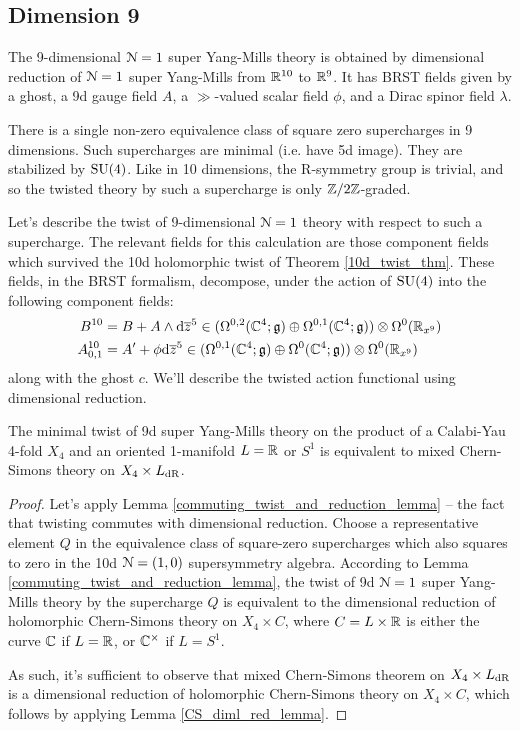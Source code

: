 \documentclass[10pt, oneside]{article}
\begin{document}
\subsection{Dimension 9}
The 9-dimensional $\mathcal{N}=1$ super Yang-Mills theory is obtained by dimensional reduction of $\mathcal{N}=1$ super Yang-Mills from $\mathbb R^{10}$ to $\mathbb R^9$.  It has BRST fields given by a ghost, a 9d gauge field $A$, a $\gg$-valued scalar field $\phi$, and a Dirac spinor field $\lambda$.

There is a single non-zero equivalence class of square zero supercharges in 9 dimensions. Such supercharges are minimal (i.e. have 5d image).  They are stabilized by $\mathrm{SU}(4)$.  Like in 10 dimensions, the R-symmetry group is trivial, and so the twisted theory by such a supercharge is only $\mathbb Z/2\mathbb Z$-graded.

Let's describe the twist of 9-dimensional $\mathcal{N}=1$ theory with respect to such a supercharge.  The relevant fields for this calculation are those component fields which survived the 10d holomorphic twist of Theorem \ref{10d_twist_thm}.  These fields, in the BRST formalism, decompose, under the action of $\mathrm{SU}(4)$ into the following component fields:
\begin{align*}
B^{10} &= B + A \wedge {\rm d} \overline{z}^5 \in (\Omega^{0,2}(\mathbb C^4; \mathfrak{g}) \oplus \Omega^{0,1}(\mathbb C^4; \mathfrak{g})) \otimes \Omega^0(\mathbb R_{x^9}) \\
A^{10}_{0,1} &= A' + \phi {\rm d} \overline{z}^5 \in (\Omega^{0,1}(\mathbb C^4; \mathfrak{g}) \oplus \Omega^0(\mathbb C^4; \mathfrak{g})) \otimes \Omega^0(\mathbb R_{x^9})
\end{align*}
along with the ghost $c$.  We'll describe the twisted action functional using dimensional reduction.


\begin{theorem} \label{9d_twist_thm}
The minimal twist of 9d super Yang-Mills theory on the product of a Calabi-Yau 4-fold $X_4$ and an oriented 1-manifold $L = \mathbb R$ or $S^1$ is equivalent to mixed Chern-Simons theory on $X_4 \times L_{\mathrm{dR}}$.
\end{theorem}

\begin{proof}
Let's apply Lemma \ref{commuting_twist_and_reduction_lemma} -- the fact that twisting commutes with dimensional reduction.  Choose a representative element $Q$ in the equivalence class of square-zero supercharges which also squares to zero in the 10d $\mathcal{N}=(1,0)$ supersymmetry algebra.  According to Lemma \ref{commuting_twist_and_reduction_lemma}, the twist of 9d $\mathcal{N}=1$ super Yang-Mills theory by the supercharge $Q$ is equivalent to the dimensional reduction of holomorphic Chern-Simons theory on $X_4 \times C$, where $C = L \times \mathbb R$ is either the curve $\mathbb C$ if $L = \mathbb R$, or $\mathbb C^\times$ if $L = S^1$. 

As such, it's sufficient to observe that mixed Chern-Simons theorem on $X_4 \times L_{\mathrm{dR}}$ is a dimensional reduction of holomorphic Chern-Simons theory on $X_4 \times C$, which follows by applying Lemma \ref{CS_diml_red_lemma}.
\end{proof}
\end{document}
